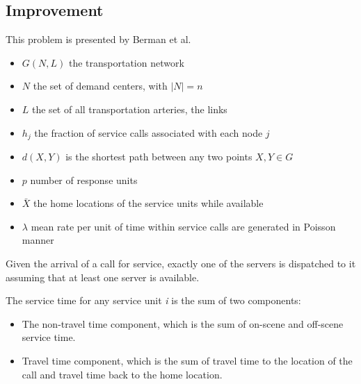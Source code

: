 \subsection{Improvement}
\begin{frame}
  This problem is presented by Berman et al. \cite{berman1987stochastic}

  \begin{itemize}
  \item $G(N,L)$ the transportation network
  \item $N$ the set of demand centers,
    with $|N| = n$
  \item $L$ the set of all transportation arteries,
    the links
  \item $h_j$ the fraction of service calls
    associated with each node $j$
  \item $d(X,Y)$ is the shortest path between any two points $X,Y \in G$
  \item $p$ number of response units
  \item $\bar{X}$ the home locations of the service units while available
  \item $\lambda$ mean rate per unit of time
    within service calls are generated in Poisson manner
  \end{itemize}
\end{frame}

\begin{frame}
  Given the arrival of a call for service,
  exactly one of the servers is dispatched to it
  assuming that at least one server is available.

  The service time for any service unit \textit{i}
  is the sum of two components:
  \begin{itemize}
  \item The non-travel time component,
    which is the sum of
    on-scene and off-scene service time.
  \item Travel time component,
    which is the sum of travel time
    to the location of the call
    and travel time back to the home location.
  \end{itemize}
\end{frame}

